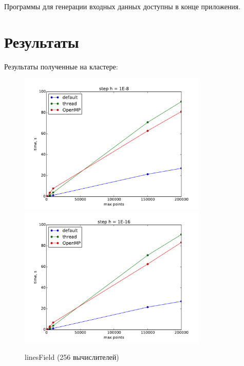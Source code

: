 \documentclass[14pt,final,titlepage,pscyr]{hedwork}
\begin{document}
	Программы для генерации входных данных доступны в конце приложения.

\newpage

\section{Результаты}
\label{sec:test}
Результаты полученные на кластере:
\begin{figure}[ht!]
    \center
    \includegraphics[width=0.8\textwidth]{linesField_cl_1E-8}
    \includegraphics[width=0.8\textwidth]{linesField_cl_1E-16}
    \caption{linesField (256 вычислителей)}
\end{figure}

\pagebreak
\end{document}
